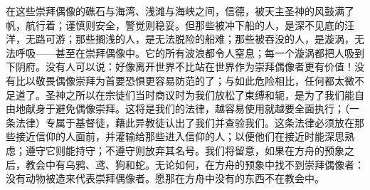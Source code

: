 在这些崇拜偶像的礁石与海湾、浅滩与海峡之间，信德，被天主圣神的风鼓满了帆，航行着；谨慎则安全，警觉则稳妥。但那些被冲下船的人，是深不见底的汪洋，无路可游；那些搁浅的人，是无法脱险的船难；那些被吞没的人，是漩涡，无法呼吸——甚至在崇拜偶像中。它的所有波浪都令人窒息；每一个漩涡都把人吸到下阴府。没有人可以说：好像离开世界不比站在世界作为崇拜偶像者更有价值！没有比以敬畏偶像崇拜为首要恐惧更容易防范的了；与如此危险相比，任何都太微不足道了。圣神之所以在宗徒们当时商议时为我们放松了束缚和轭，是为了我们能自由地献身于避免偶像崇拜。这将是我们的法律，越容易使用就越要全面执行；（一条法律）专属于基督徒，藉此异教徒认出了我们并查验我们。这条法律必须放在那些接近信仰的人面前，并灌输给那些进入信仰的人；以便他们在接近时能深思熟虑；遵守它则能持守；不遵守则放弃其名号。我们将留意，如果在方舟的预象之后，教会中有乌鸦、鸢、狗和蛇。无论如何，在方舟的预象中找不到崇拜偶像者：没有动物被造来代表崇拜偶像者。愿那在方舟中没有的东西不在教会中。\par

